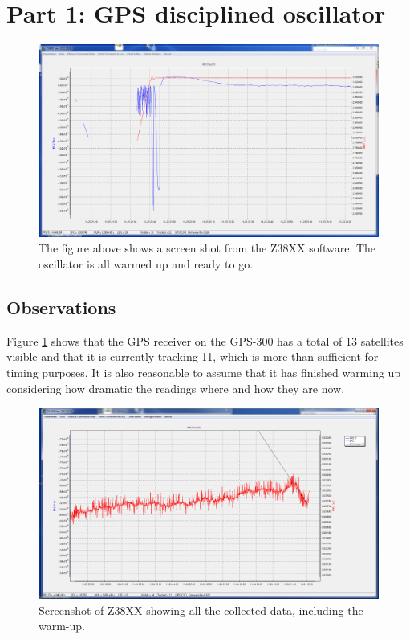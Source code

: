 \documentclass[11pt,english,a4paper]{article}
\begin{document}
\section{Part 1: GPS disciplined oscillator}
\begin{figure}[!htb]
  \centering
  \includegraphics[width=1\textwidth]{z38xx_EFC_oppstart.PNG}
  \caption[Z38XX screen shot] {The figure above shows a screen shot from the Z38XX software. The oscillator is all warmed up and ready to go.} 
  \label{fig:z38xx_oppstart}
\end{figure}

\subsection{Observations}
Figure \ref{fig:z38xx_oppstart} shows that the GPS receiver on the GPS-300 has a total of 13 satellites visible and that it is currently tracking 11, which is more than sufficient for timing purposes. It is also reasonable to assume that it has finished warming up considering how dramatic the readings where and how they are now. 

\begin{figure}[!htb]
  \centering
    \includegraphics[width=1\textwidth]{z38xx_EFC_oppvarmet_zoom.PNG}
      \caption{Screenshot of Z38XX showing all the collected data, including the warm-up.}
      \label{fig:Z38XX_gpsdo12}
\end{figure}
\end{document}
